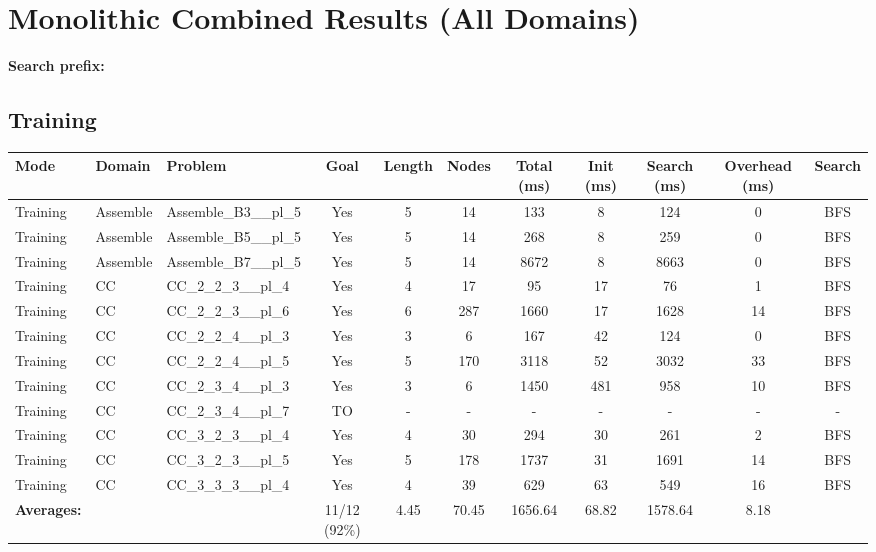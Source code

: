 \documentclass{article}
\begin{document}
\section*{Monolithic Combined Results (All Domains)}
\textbf{Search prefix:} 
\\[0.5cm]
\subsection*{Training}
\begin{tabular}{lllcccccccc}
\toprule
Mode & Domain & Problem & Goal & Length & Nodes & Total (ms) & Init (ms) & Search (ms) & Overhead (ms) & Search \\
\midrule
Training & Assemble & Assemble\_B3\_\_pl\_5 & Yes & 5 & 14 & 133 & 8 & 124 & 0 & BFS \\
Training & Assemble & Assemble\_B5\_\_pl\_5 & Yes & 5 & 14 & 268 & 8 & 259 & 0 & BFS \\
Training & Assemble & Assemble\_B7\_\_pl\_5 & Yes & 5 & 14 & 8672 & 8 & 8663 & 0 & BFS \\
Training & CC & CC\_2\_2\_3\_\_pl\_4 & Yes & 4 & 17 & 95 & 17 & 76 & 1 & BFS \\
Training & CC & CC\_2\_2\_3\_\_pl\_6 & Yes & 6 & 287 & 1660 & 17 & 1628 & 14 & BFS \\
Training & CC & CC\_2\_2\_4\_\_pl\_3 & Yes & 3 & 6 & 167 & 42 & 124 & 0 & BFS \\
Training & CC & CC\_2\_2\_4\_\_pl\_5 & Yes & 5 & 170 & 3118 & 52 & 3032 & 33 & BFS \\
Training & CC & CC\_2\_3\_4\_\_pl\_3 & Yes & 3 & 6 & 1450 & 481 & 958 & 10 & BFS \\
Training & CC & CC\_2\_3\_4\_\_pl\_7 & TO & - & - & - & - & - & - & - \\
Training & CC & CC\_3\_2\_3\_\_pl\_4 & Yes & 4 & 30 & 294 & 30 & 261 & 2 & BFS \\
Training & CC & CC\_3\_2\_3\_\_pl\_5 & Yes & 5 & 178 & 1737 & 31 & 1691 & 14 & BFS \\
Training & CC & CC\_3\_3\_3\_\_pl\_4 & Yes & 4 & 39 & 629 & 63 & 549 & 16 & BFS \\
\textbf{Averages:} & & & 11/12 (92\%) & 4.45 & 70.45 & 1656.64 & 68.82 & 1578.64 & 8.18 & \\
\bottomrule
\end{tabular}
\newpage
\end{document}
